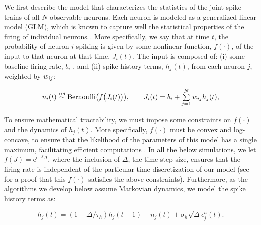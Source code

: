 We first describe the model that characterizes the statistics of the joint spike trains of all $N$ observable neurons.  Each neuron is modeled as a generalized linear model (GLM), which is known to capture well the statistical properties of the firing of individual neurons \cite{PILL07, PAN03d, Wu07, Rigat06, OKA05}.  More specifically, we say that at time $t$, the probability of neuron $i$ spiking is given by some nonlinear function, $f(\cdot)$, of the input to that neuron at that time, $J_i(t)$.  The input is composed of: (i) some baseline firing rate, $b_i$%
, and (ii) spike history terms, $h_j(t)$, from each neuron $j$, weighted by $w_{ij}$:

\begin{equation} \label{eqn:glm:definition}
\begin{array}{l}
n_i(t)\overset{iid}{\sim} \text{Bernoulli}\big(f\big(J_i(t)\big)\big), \qquad %
J_i(t)=b_i+\sum \limits_{j=1}^{N}  \w_{ij} h_{j}(t), %
\end{array}
\end{equation}

\noindent To ensure mathematical tractability, we must impose some constraints on $f(\cdot)$ and the dynamics of $h_j(t)$.  More specifically, $f(\cdot)$ must be convex and log-concave, to ensure that the likelihood of the parameters of this model has a single maximum, facilitating efficient computations \cite{PAN03d}.  In all the below simulations, we let $f(J)=\text{e}^{\text{e}^{-J}\Delta}$, where the inclusion of $\Delta$, the time step size, ensures that the firing rate is independent of the particular time discretization of our model (see \cite{??} for a proof that this $f(\cdot)$ satisfies the above constraints).  Furthermore, as the algorithms we develop below assume Markovian dynamics, we model the spike history terms as:

\begin{equation} \label{eqn:h:definition}
h_j(t) = (1- \Delta/\tau_h) h_j(t-1) +n_j(t) + \sigma_h \sqrt{\Delta} \epsilon^h_j(t).
\end{equation}

